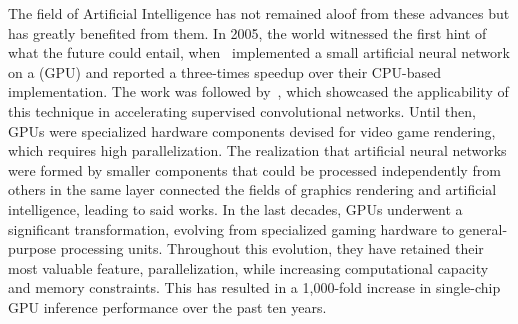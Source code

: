 The field of Artificial Intelligence has not remained aloof from these advances but has greatly benefited from them. In 2005, the world witnessed the first hint of what the future could entail, when~ implemented a small artificial neural network on a  (GPU) and reported a three-times speedup over their CPU-based implementation. The work was followed by~, which showcased the applicability of this technique in accelerating supervised convolutional networks. Until then, GPUs were specialized hardware components devised for video game rendering, which requires high parallelization. The realization that artificial neural networks were formed by smaller components that could be processed independently from others in the same layer connected the fields of graphics rendering and artificial intelligence, leading to said works. In the last decades, GPUs underwent a significant transformation, evolving from specialized gaming hardware to general-purpose processing units. Throughout this evolution, they have retained their most valuable feature, parallelization, while increasing computational capacity and memory constraints. This has resulted in a 1,000-fold increase in single-chip GPU inference performance over the past ten years.


